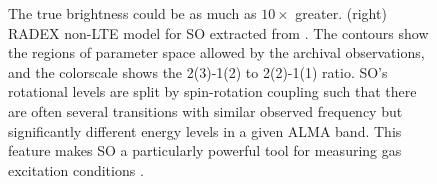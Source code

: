 \documentclass[12pt,a4paper]{article}  %
\newcommand{\msun}{\ensuremath{\mathrm{M}_\odot}\xspace}
\begin{document}
\begin{figure}
{    The true brightness could be as much as $10\times$ greater.
    (right) RADEX non-LTE model for SO extracted from \citet{Ginsburg2024}.
    The contours show the regions of parameter space allowed by the archival observations, and the colorscale shows the 2(3)-1(2) to 2(2)-1(1) ratio.
    SO's rotational levels are split by spin-rotation coupling such that there are often several transitions with similar observed frequency but significantly different energy levels in a given ALMA band.
    This feature makes SO a particularly powerful tool for measuring gas excitation conditions \citep{Lique2007}.
    }
    \label{fig:csradex}
\end{figure}




{}



\end{document}
